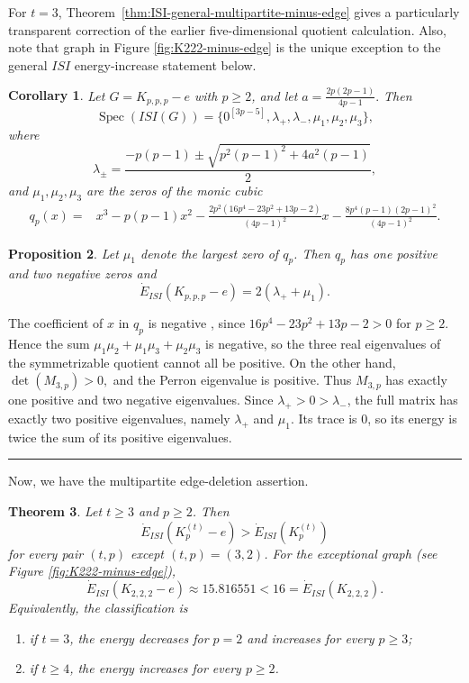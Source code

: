 \documentclass[12pt,twoside]{article}
\renewenvironment{proof}{{\noindent\bfseries Proof.}}{\qed}
\newcommand{\spec}{\operatorname{Spec}}
\newtheorem{theorem}{Theorem}[section]
\newtheorem{corollary}[theorem]{Corollary}
\newtheorem{proposition}[theorem]{Proposition}
\def\qed{\nolinebreak\hfill\rule{.2cm}{.2cm}\par\addvspace{.5cm}}
\begin{document}
For $t=3$, Theorem~\ref{thm:ISI-general-multipartite-minus-edge} gives a particularly transparent correction of the earlier five-dimensional quotient calculation. Also, note that graph in Figure \ref{fig:K222-minus-edge} is the unique exception to the general $ISI$ energy-increase statement below.
\begin{corollary}\label{cor:ISI-tripartite-corrected-spectrum}
	Let $G=K_{p,p,p}-e$ with $p\geq2$, and let
	$
	a=\tfrac{2p(2p-1)}{4p-1}.
	$
	Then
	$$
	\spec(ISI(G))
	=
	\Big\{0^{[3p-5]},\lambda_+,\lambda_-,\mu_1,\mu_2,\mu_3\Big\},
	$$
	where
	$$
	\lambda_{\pm}
	=
	\frac{-p(p-1)\pm\sqrt{p^2(p-1)^2+4a^2(p-1)}}{2},
	$$
	and $\mu_1,\mu_2,\mu_3$ are the zeros of the monic cubic
	$$
	\begin{aligned}
		q_p(x)={}&x^3-p(p-1)x^2-\frac{2p^2(16p^4-23p^2+13p-2)}{(4p-1)^2}x
		-\frac{8p^4(p-1)(2p-1)^2}{(4p-1)^2}.
	\end{aligned}
	$$ 
\end{corollary}

\begin{proposition}\label{prop:ISI-tripartite-energy}
	Let $\mu_1$ denote the largest zero of $q_p$. Then $q_p$ has one positive and two negative zeros and
	$$
	\dot E_{ISI}(K_{p,p,p}-e)=2(\lambda_++\mu_1).
	$$
\end{proposition}

\begin{proof}
	The coefficient of $x$ in $q_p$ is negative , since
	$
	16p^4-23p^2+13p-2>0
	$
	for $p\geq2$. Hence the sum $\mu_1\mu_2+\mu_1\mu_3+\mu_2\mu_3$ is negative, so the three real eigenvalues of the symmetrizable quotient cannot all be positive. On the other hand,
	$
	\det(M_{3,p})>0,
	$
	and the Perron eigenvalue is positive. Thus $M_{3,p}$ has exactly one positive and two negative eigenvalues. Since $\lambda_+>0>\lambda_-$, the full matrix has exactly two positive eigenvalues, namely $\lambda_+$ and $\mu_1$. Its trace is $0$, so its energy is twice the sum of its positive eigenvalues.
\end{proof}

Now, we  have the multipartite edge-deletion assertion. 
\begin{theorem}\label{thm:ISI-multipartite-energy-change-corrected}
	Let $t\geq3$ and $p\geq2$. Then
	$$
	\dot E_{ISI}(K_p^{(t)}-e)>\dot E_{ISI}(K_p^{(t)})
	$$
	for every pair $(t,p)$ except $(t,p)=(3,2)$. For the exceptional graph (see Figure \ref{fig:K222-minus-edge}),
	$$
	\dot E_{ISI}(K_{2,2,2}-e)\approx15.816551<16
	=
	\dot E_{ISI}(K_{2,2,2}).
	$$
	Equivalently, the classification is
	\begin{enumerate}
		\item if $t=3$, the energy decreases for $p=2$ and increases for every $p\geq3$;
		\item if $t\geq4$, the energy increases for every $p\geq2$.
	\end{enumerate}
\end{theorem}
\end{document}
